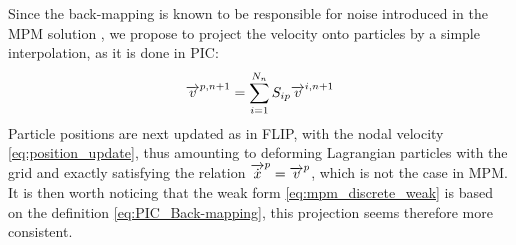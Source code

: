 Since the back-mapping is known to be responsible for noise introduced in the MPM solution \cite{Mass_Flip}, we propose to project the velocity onto particles by a simple interpolation, as it is done in PIC:
\begin{equation}
  \label{eq:PIC_Back-mapping}
  {\overrightarrow{v}}^{p,n+1}=\sum_{i=1}^{N_n} S_{ip}{\overrightarrow{v}}^{i,n+1}
\end{equation}
Particle positions are next updated as in FLIP, with the nodal velocity \eqref{eq:position_update}, thus amounting to deforming Lagrangian particles with the grid and exactly satisfying the relation ${\overrightarrow{\dot{x}}}^p={\overrightarrow{v}}^p$, which is not the case in MPM.
It is then worth noticing that the weak form \eqref{eq:mpm_discrete_weak} is based on the definition \eqref{eq:PIC_Back-mapping}, this projection seems therefore more consistent.

